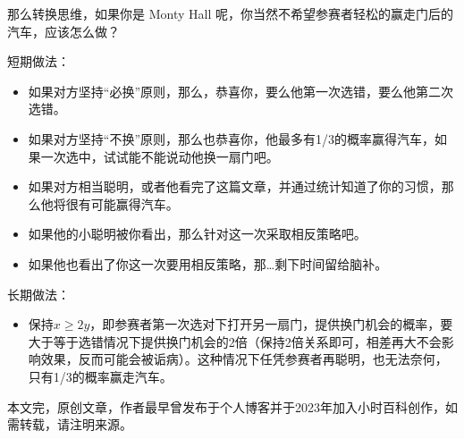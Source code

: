 那么转换思维，如果你是 Monty Hall 呢，你当然不希望参赛者轻松的赢走门后的汽车，应该怎么做？

短期做法：

\begin{itemize}
\item 如果对方坚持“必换”原则，那么，恭喜你，要么他第一次选错，要么他第二次选错。
\item 如果对方坚持“不换”原则，那么也恭喜你，他最多有1/3的概率赢得汽车，如果一次选中，试试能不能说动他换一扇门吧。
\item 如果对方相当聪明，或者他看完了这篇文章，并通过统计知道了你的习惯，那么他将很有可能赢得汽车。
\item 如果他的小聪明被你看出，那么针对这一次采取相反策略吧。
\item 如果他也看出了你这一次要用相反策略，那…剩下时间留给脑补。
\end{itemize}

长期做法：

\begin{itemize}
\item 保持$x\ge 2y$，即参赛者第一次选对下打开另一扇门，提供换门机会的概率，要大于等于选错情况下提供换门机会的2倍（保持2倍关系即可，相差再大不会影响效果，反而可能会被诟病）。这种情况下任凭参赛者再聪明，也无法奈何，只有1/3的概率赢走汽车。
\end{itemize}

本文完，原创文章，作者最早曾发布于个人博客并于2023年加入小时百科创作，如需转载，请注明来源。
